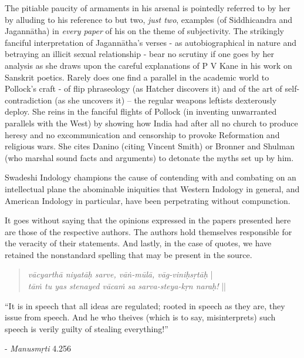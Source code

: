 The pitiable paucity of armaments in his arsenal is pointedly referred to by her by alluding to his reference to but two, {\sl just two}, examples (of Siddhicandra and Jagannātha) in {\sl every paper} of his on the theme of subjectivity. The strikingly fanciful interpretation of Jagannātha’s verses - as autobiographical in nature and betraying an illicit sexual relationship - bear no scrutiny if one goes by her analysis as she draws upon the careful explanations of P V Kane in his work on Sanskrit poetics. Rarely does one find a parallel in the academic world to Pollock’s craft - of flip phraseology (as Hatcher discovers it) and of the art of self-contradiction (as she uncovers it) -- the regular weapons leftists dexterously deploy. She reins in the fanciful flights of Pollock (in inventing unwarranted parallels with the West) by showing how India had after all no church to produce heresy and no excommunication and censorship to provoke Reformation and religious wars. She cites Danino (citing Vincent Smith) or Bronner and Shulman (who marshal sound facts and arguments) to detonate the myths set up by him. 

Swadeshi Indology champions the cause of contending with and combating on an intellectual plane the abominable iniquities that Western Indology in general, and American Indology in particular, have been perpetrating without compunction.

It goes without saying that the opinions expressed in the papers presented here are those of the respective authors. The authors hold themselves responsible for the veracity of their statements. And lastly, in the case of quotes, we have retained the nonstandard spelling that may be present in the source.

\begin{quote}
{{\sl vācyarthā niyatāḥ sarve, vāṅ-mūlā, vāg-viniḥsṛtāḥ}} |\\
{\sl tāṁ tu yas stenayed vācaṁ sa sarva-steya-kṛn naraḥ!} ||
\end{quote}

\begin{center}
“It is in speech that all ideas are regulated; rooted in speech as they are, they issue from speech. And he who theives (which is to say, misinterprets) such speech is verily guilty of stealing everything!”
\end{center}

\noindent
\hfill	- {\sl Manusmṛti} 4.256\qquad\,

